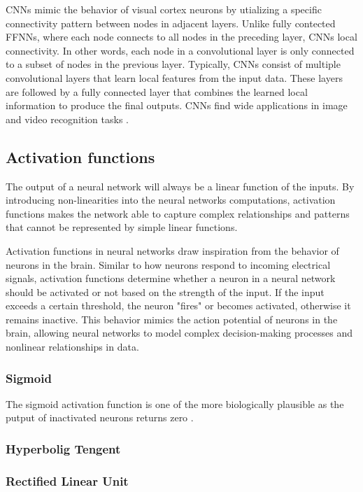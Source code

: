 \documentclass[a4paper, UKenglish, 11pt]{uiomaster}
\begin{document}
CNNs mimic the behavior of visual cortex neurons by utializing a specific connectivity pattern between nodes in adjacent layers. Unlike fully contected FFNNs, where each node connects to all nodes in the preceding layer, CNNs  local connectivity. In other words, each node in a convolutional layer is only connected to a subset of nodes in the previous layer. Typically, CNNs consist of multiple convolutional layers that learn local features from the input data. These layers are followed by a fully connected layer that combines the learned local information to produce the final outputs. CNNs find wide applications in image and video recognition tasks \cite{Hjorth-Jensen2022}.

\subsection{Activation functions}
The output of a neural network will always be a linear function of the inputs. By introducing  non-linearities into the neural networks computations, activation functions makes the network able to capture complex relationships and patterns that cannot be represented by simple linear functions.

Activation functions in neural networks draw inspiration from the behavior of neurons in the brain. Similar to how neurons respond to incoming electrical signals, activation functions determine whether a neuron in a neural network should be activated or not based on the strength of the input. If the input exceeds a certain threshold, the neuron "fires" or becomes activated, otherwise it remains inactive. This behavior mimics the action potential of neurons in the brain, allowing neural networks to model complex decision-making processes and nonlinear relationships in data.


\subsubsection{Sigmoid}
The sigmoid activation function is one of the more biologically plausible as the putput of inactivated neurons returns zero \cite{Jensen2022}. 

\subsubsection{Hyperbolig Tengent}

\subsubsection{Rectified Linear Unit}
\end{document}
